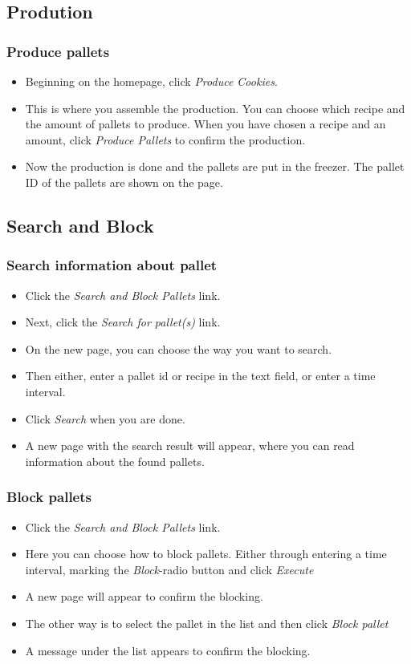 \documentclass[a4paper]{article}
\begin{document}
\subsection{Prodution}
\subsubsection{Produce pallets}
\begin{itemize}
  \item Beginning on the homepage, click \emph{Produce Cookies}.
  \item This is where you assemble the production. You can choose which recipe and the amount of pallets to produce. When you have chosen a recipe and an amount, click \emph{Produce Pallets} to confirm the production.
  \item Now the production is done and the pallets are put in the freezer. The pallet ID of the pallets are shown on the page.
\end{itemize}

\subsection{Search and Block}
\subsubsection{Search information about pallet}
\begin{itemize}
	\item Click the \emph{Search and Block Pallets} link.
	\item Next, click the \emph{Search for pallet(s)} link.
	\item On the new page, you can choose the way you want to search.
	\item Then either, enter a pallet id or recipe in the text field, or enter a time interval.
	\item Click \emph{Search} when you are done.
	\item A new page with the search result will appear, where you can read information about the found pallets.
\end{itemize}
\subsubsection{Block pallets}
\begin{itemize}
	\item Click the \emph{Search and Block Pallets} link.
	\item Here you can choose how to block pallets. Either through entering a time interval, marking the \emph{Block}-radio button and click \emph{Execute} 
	\item A new page will appear to confirm the blocking.
	\item The other way is to select the pallet in the list and then click \emph{Block pallet}
	\item A message under the list appears to confirm the blocking.
\end{itemize}
\end{document}

